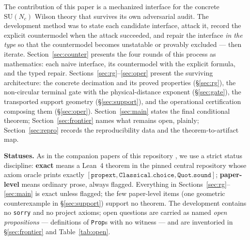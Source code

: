 \documentclass[11pt]{article}
\theoremstyle{definition}
\newcommand{\lean}[1]{\texttt{#1}}
\newcommand{\SU}{\mathrm{SU}}
\begin{document}
The contribution of this paper is a mechanized interface for the
concrete $\SU(N_c)$ Wilson theory that survives its own adversarial
audit.  The development method was to state each candidate interface,
attack it, record the explicit countermodel when the attack succeeded,
and repair the interface \emph{in the type} so that the countermodel
becomes unstatable or provably excluded --- then iterate.
Section~\ref{sec:counter} presents the four rounds of this process as
mathematics: each naive interface, its countermodel with the explicit
formula, and the typed repair.  Sections~\ref{sec:rg}--\ref{sec:oper}
present the surviving architecture: the concrete decimation and its
proved properties (\S\ref{sec:rg}), the non-circular terminal gate
with the physical-distance exponent (\S\ref{sec:gate}), the transported
support geometry (\S\ref{sec:support}), and the operational
certification composing them (\S\ref{sec:oper}).
Section~\ref{sec:main} states the final conditional theorem;
Section~\ref{sec:frontier} names what remains open, plainly;
Section~\ref{sec:repro} records the reproducibility data and the
theorem-to-artifact map.

\medskip
\noindent\textbf{Statuses.}  As in the companion papers of this
repository \cite{ErikssonC2,ErikssonC3,ErikssonC4,ErikssonC5}, we use
a strict status discipline: \textbf{exact} means a Lean~4 theorem in
the pinned central repository whose axiom oracle prints exactly
$[\lean{propext}, \lean{Classical.choice}, \lean{Quot.sound}]$;
\textbf{paper-level} means ordinary prose, always flagged.  Everything
in Sections~\ref{sec:rg}--\ref{sec:main} is exact unless flagged; the
few paper-level items (one geometric counterexample in
\S\ref{sec:support}) support no theorem.  The development contains no
\lean{sorry} and no project axioms; open questions are carried as
named \emph{open propositions} --- definitions of \lean{Prop}s with no
witness --- and are inventoried in \S\ref{sec:frontier} and
Table~\ref{tab:open}.
\end{document}
